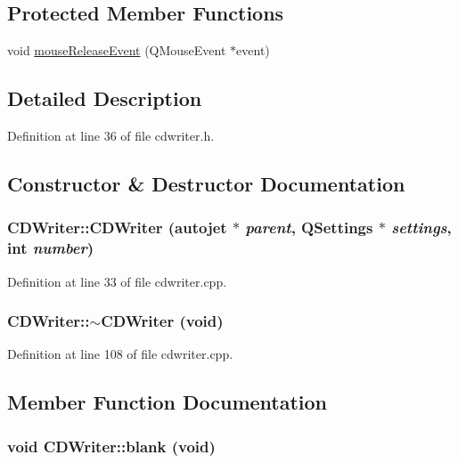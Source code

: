 \subsection*{Protected Member Functions}
\begin{CompactItemize}
\item 
void \hyperlink{class_c_d_writer_712e2295621dccbe6866a3b539a8006c}{mouseReleaseEvent} (QMouseEvent $\ast$event)
\end{CompactItemize}


\subsection{Detailed Description}


Definition at line 36 of file cdwriter.h.

\subsection{Constructor \& Destructor Documentation}
\hypertarget{class_c_d_writer_44fe78fc3cfdb9c9cc0a427686141ade}{
\subsubsection[{CDWriter}]{\setlength{\rightskip}{0pt plus 5cm}CDWriter::CDWriter ({\bf autojet} $\ast$ {\em parent}, \/  QSettings $\ast$ {\em settings}, \/  int {\em number})}}
\label{class_c_d_writer_44fe78fc3cfdb9c9cc0a427686141ade}




Definition at line 33 of file cdwriter.cpp.\hypertarget{class_c_d_writer_072733059c989992f725774bee5331b7}{
\subsubsection[{$\sim$CDWriter}]{\setlength{\rightskip}{0pt plus 5cm}CDWriter::$\sim$CDWriter (void)}}
\label{class_c_d_writer_072733059c989992f725774bee5331b7}




Definition at line 108 of file cdwriter.cpp.

\subsection{Member Function Documentation}
\hypertarget{class_c_d_writer_74d2e90422414e44485b258b5be222d8}{
\subsubsection[{blank}]{\setlength{\rightskip}{0pt plus 5cm}void CDWriter::blank (void)}}
\label{class_c_d_writer_74d2e90422414e44485b258b5be222d8}





